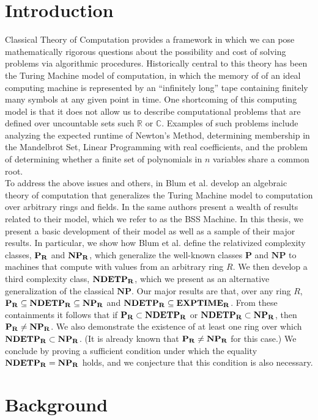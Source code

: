 \chapter{Introduction}

Classical Theory of Computation provides a framework in which we can
pose mathematically rigorous questions about the possibility and cost
of solving problems via algorithmic procedures.  Historically central
to this theory has been the Turing Machine model of computation, in
which the memory of of an ideal computing machine is represented by an
``infinitely long'' tape containing finitely many symbols at any given
point in time.  One shortcoming of this computing model is that it
does not allow us to describe computational problems that are defined
over uncountable sets such $\mathbb{R}$ or $\mathbb{C}$.  Examples of
such problems include analyzing the expected runtime of Newton's
Method, determining membership in the Mandelbrot Set, Linear
Programming with real coefficients, and the problem of determining
whether a finite set of polynomials in $n$ variables share a common
root.\\

To address the above issues and others, in \cite{B89} Blum et
al. develop an algebraic theory of computation that generalizes the
Turing Machine model to computation over arbitrary rings and fields.
In \cite{B98} the same authors present a wealth of results related to
their model, which we refer to as the BSS Machine. In this thesis, we
present a basic development of their model as well as a sample of
their major results.  In particular, we show how Blum et al. define
the relativized complexity classes, $\mathbf{P_R}$ and $\mathbf{NP_R}$, which generalize
the well-known classes $\mathbf{P}$ and $\mathbf{NP}$ to machines that
compute with values from an arbitrary ring $R$.  We then develop a
third complexity class, $\mathbf{NDETP_R}$, which we present as an alternative
generalization of the classical $\mathbf{NP}$.  Our major results are
that, over any ring $R$, $\mathbf{P_R} \subseteq \mathbf{NDETP_R} \subseteq \mathbf{NP_R}$ and
$\mathbf{NDETP_R} \subseteq \mathbf{EXPTIME_R}$. From these containments it follows that
if $\mathbf{P_R} \subset \mathbf{NDETP_R}$ or $\mathbf{NDETP_R} \subset \mathbf{NP_R}$, then $\mathbf{P_R} \neq \mathbf{NP_R}$.
We also demonstrate the existence of at least one ring over which
$\mathbf{NDETP_R} \subset \mathbf{NP_R}$.  (It is already known that $\mathbf{P_R} \neq \mathbf{NP_R}$ for
this case.)  We conclude by proving a sufficient condition under which
the equality $\mathbf{NDETP_R} = \mathbf{NP_R}$ holds, and we conjecture that this
condition is also necessary.

\chapter{Background}


